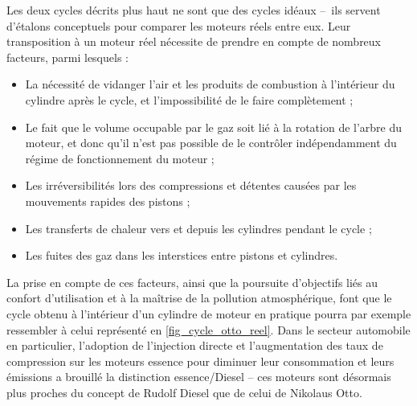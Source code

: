 		Les deux cycles décrits plus haut ne sont que des cycles idéaux --\ ils servent d’étalons conceptuels pour comparer les moteurs réels entre eux. Leur transposition à un moteur réel nécessite de prendre en compte de nombreux facteurs, parmi lesquels :
		\begin{itemize}
			\item La nécessité de vidanger l’air et les produits de combustion à l’intérieur du cylindre après le cycle, et l’impossibilité de le faire complètement ;
			\item Le fait que le volume occupable par le gaz soit lié à la rotation de l’arbre du moteur, et donc qu’il n’est pas possible de le contrôler indépendamment du régime de fonctionnement du moteur ;
			\item Les irréversibilités lors des compressions et détentes causées par les mouvements rapides des pistons ;
			\item Les transferts de chaleur vers et depuis les cylindres pendant le cycle ;
			\item Les fuites des gaz dans les interstices entre pistons et cylindres.
		\end{itemize}

		La prise en compte de ces facteurs, ainsi que la poursuite d’objectifs liés au confort d’utilisation et à la maîtrise de la pollution atmosphérique, font que le cycle obtenu à l’intérieur d’un cylindre de moteur en pratique pourra par exemple ressembler à celui représenté en \cref{fig_cycle_otto_reel}. Dans le secteur automobile en particulier, l’adoption de l’injection directe et l’augmentation des taux de compression sur les moteurs essence pour diminuer leur consommation et leurs émissions a brouillé la distinction essence/Diesel -- ces moteurs sont désormais plus proches du concept de Rudolf Diesel que de celui de Nikolaus Otto.

